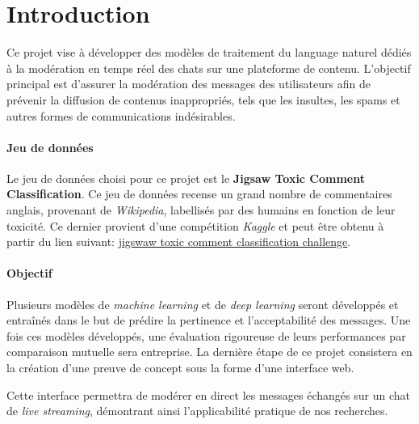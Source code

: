 
\chapter{Introduction}

Ce projet vise à développer des modèles de traitement du language naturel dédiés à la modération en temps réel des chats sur une plateforme de contenu. L'objectif principal est d'assurer la modération des messages des utilisateurs afin de prévenir la diffusion de contenus inappropriés, tels que les insultes, les spams et autres formes de communications indésirables.
\subsubsection*{Jeu de données} 
Le jeu de données choisi pour ce projet est le \textbf{Jigsaw Toxic Comment Classification}.
Ce jeu de données recense un grand nombre de commentaires anglais, provenant de \textit{Wikipedia}, labellisés par des humains en fonction de leur toxicité.
Ce dernier provient d'une compétition \textit{Kaggle} et peut être obtenu à partir du lien suivant: \href{https://www.kaggle.com/competitions/jigsaw-toxic-comment-classification-challenge/data}{jigswaw toxic comment classification challenge}.

\subsubsection*{Objectif}
Plusieurs modèles de \textit{machine learning} et de \textit{deep learning} seront développés et entraînés dans le but de prédire la pertinence et l'acceptabilité des messages.
Une fois ces modèles développés, une évaluation rigoureuse de leurs performances par comparaison mutuelle sera entreprise. 
La dernière étape de ce projet consistera en la création d'une preuve de concept sous la forme d'une interface web. 

Cette interface permettra de modérer en direct les messages échangés sur un chat de \textit{live streaming}, démontrant ainsi l'applicabilité pratique de nos recherches.
